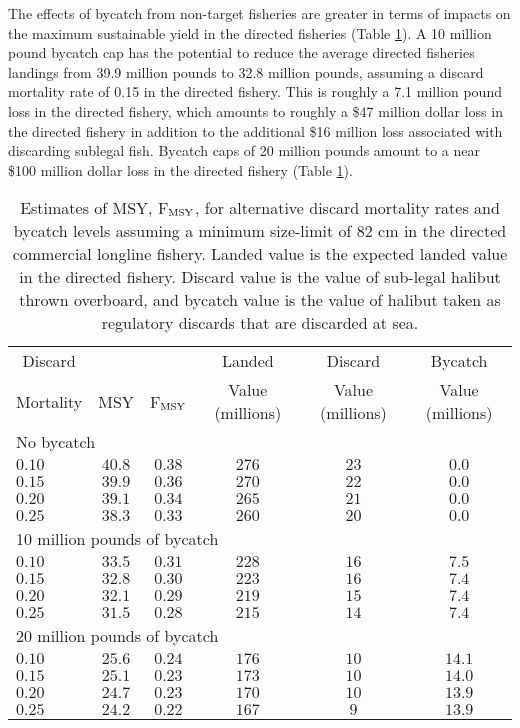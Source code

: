 \documentclass[12pt,leqno]{article}
\newcommand{\fmsy}{F$_{\textnormal{MSY}}$}
\begin{document}
The effects of bycatch from non-target fisheries are greater in terms of impacts on the maximum sustainable yield in the directed fisheries (Table \ref{tab:landedValue}).  A 10 million pound bycatch cap has the potential to reduce the average directed fisheries landings from 39.9 million pounds to 32.8 million pounds, assuming a discard mortality rate of 0.15 in the directed fishery.  This is roughly a 7.1 million pound loss in the directed fishery, which amounts to roughly a \$47 million dollar loss in the directed fishery in addition to the additional \$16 million loss associated with discarding sublegal fish.  Bycatch caps of 20 million pounds amount to a near \$100 million dollar loss in the directed fishery (Table \ref{tab:landedValue}).

\begin{table}[!tbp]
\caption{Estimates of MSY, \fmsy, for alternative discard mortality rates and bycatch levels assuming a minimum size-limit of 82 cm in the directed commercial longline fishery. Landed value is the expected landed value in the directed fishery. Discard value is the value of sub-legal halibut thrown overboard, and bycatch value is the value of halibut taken as regulatory discards that are discarded at sea.}\label{tab:landedValue}
\begin{center}
\begin{tabular}{lccccc}
\hline\hline
\multicolumn{1}{c}{Discard}&
\multicolumn{1}{c}{}&
\multicolumn{1}{c}{}&
\multicolumn{1}{c}{Landed}&
\multicolumn{1}{c}{Discard}&
\multicolumn{1}{c}{Bycatch}
\tabularnewline
\multicolumn{1}{c}{Mortality}&
\multicolumn{1}{c}{MSY}&
\multicolumn{1}{c}{\fmsy}&
\multicolumn{1}{c}{Value (millions)}&
\multicolumn{1}{c}{Value (millions)}&
\multicolumn{1}{c}{Value (millions)}
\tabularnewline
\hline
\multicolumn{6}{l}{No bycatch} \tabularnewline
$0.10$ & $40.8$ & $0.38$ & $276$ & $23$ & $ 0.0$\tabularnewline
$0.15$ & $39.9$ & $0.36$ & $270$ & $22$ & $ 0.0$\tabularnewline
$0.20$ & $39.1$ & $0.34$ & $265$ & $21$ & $ 0.0$\tabularnewline
$0.25$ & $38.3$ & $0.33$ & $260$ & $20$ & $ 0.0$\tabularnewline
\hline
\multicolumn{6}{l}{10 million pounds of bycatch} \tabularnewline
$0.10$ & $33.5$ & $0.31$ & $228$ & $16$ & $ 7.5$\tabularnewline
$0.15$ & $32.8$ & $0.30$ & $223$ & $16$ & $ 7.4$\tabularnewline
$0.20$ & $32.1$ & $0.29$ & $219$ & $15$ & $ 7.4$\tabularnewline
$0.25$ & $31.5$ & $0.28$ & $215$ & $14$ & $ 7.4$\tabularnewline
\hline
\multicolumn{6}{l}{20 million pounds of bycatch} \tabularnewline
$0.10$ & $25.6$ & $0.24$ & $176$ & $10$ & $14.1$\tabularnewline
$0.15$ & $25.1$ & $0.23$ & $173$ & $10$ & $14.0$\tabularnewline
$0.20$ & $24.7$ & $0.23$ & $170$ & $10$ & $13.9$\tabularnewline
$0.25$ & $24.2$ & $0.22$ & $167$ & $ 9$ & $13.9$\tabularnewline
\hline
\end{tabular}
\end{center}
\end{table}
\end{document}
